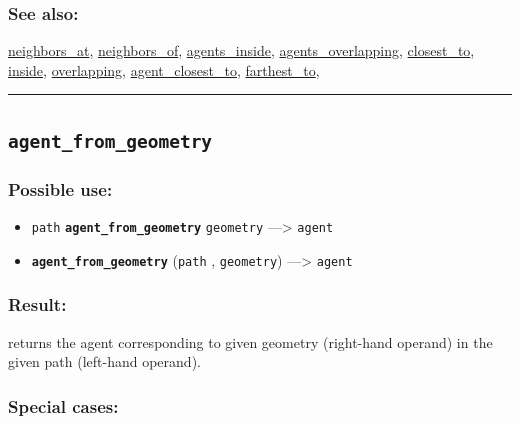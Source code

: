 \documentclass[]{book}
\providecommand{\tightlist}{%
  \setlength{\itemsep}{0pt}\setlength{\parskip}{0pt}}
\theoremstyle{definition}
\theoremstyle{definition}
\theoremstyle{definition}
\theoremstyle{remark}
\begin{document}
\subsubsection{See also:}\label{see-also-19}

\href{operators-n-to-r.html\#neighbors_at}{neighbors\_at},
\href{operators-n-to-r.html\#neighbors_of}{neighbors\_of},
\href{operators-a-to-a.html\#agents_inside}{agents\_inside},
\href{operators-a-to-a.html\#agents_overlapping}{agents\_overlapping},
\href{operators-b-to-c.html\#closest_to}{closest\_to},
\href{operators-i-to-m.html\#inside}{inside},
\href{operators-n-to-r.html\#overlapping}{overlapping},
\href{operators-a-to-a.html\#agent_closest_to}{agent\_closest\_to},
\href{operators-d-to-h.html\#farthest_to}{farthest\_to},

\begin{center}\rule{0.5\linewidth}{\linethickness}\end{center}

\subsection{\texorpdfstring{\texttt{agent\_from\_geometry}}{agent\_from\_geometry}}\label{agent_from_geometry}

\subsubsection{Possible use:}\label{possible-use-28}

\begin{itemize}
\tightlist
\item
  \texttt{path} \textbf{\texttt{agent\_from\_geometry}}
  \texttt{geometry} ---\textgreater{} \texttt{agent}
\item
  \textbf{\texttt{agent\_from\_geometry}} (\texttt{path} ,
  \texttt{geometry}) ---\textgreater{} \texttt{agent}
\end{itemize}

\subsubsection{Result:}\label{result-27}

returns the agent corresponding to given geometry (right-hand operand)
in the given path (left-hand operand).

\subsubsection{Special cases:}\label{special-cases-14}
\end{document}
